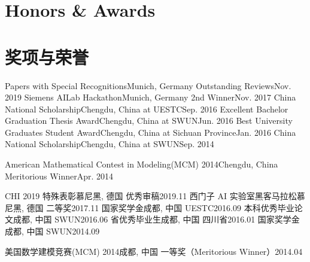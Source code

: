
 {
\section{\textbf{Honors \& Awards}}
}{
\section{\textbf{奖项与荣誉}}
}

 {
  \resumeSubHeadingListStart
    \resumeSubheading
        {Papers with Special Recognitions}{Munich, Germany}
        {Outstanding Reviews}{Nov. 2019}
    \resumeSubheading
        {Siemens AILab Hackathon}{Munich, Germany}
        {2nd Winner}{Nov. 2017}
    \resumeSubheading
        {China National Scholarship}{Chengdu, China}
        {at UESTC}{Sep. 2016}
    \resumeSubheading
        {Excellent Bachelor Graduation Thesis Award}{Chengdu, China}
        {at SWUN}{Jun. 2016}
    \resumeSubheading
        {Best University Graduates Student Award}{Chengdu, China}
        {at Sichuan Province}{Jan. 2016}
    \resumeSubheading
        {China National Scholarship}{Chengdu, China}
        {at SWUN}{Sep. 2014}

    \resumeSubheading
        {American Mathematical Contest in Modeling(MCM) 2014}{Chengdu, China}
        {Meritorious Winner}{Apr. 2014}
  \resumeSubHeadingListEnd
}{

    \resumeSubHeadingListStart
    \resumeSubheading
        {CHI 2019 特殊表彰}{慕尼黑, 德国}
        {优秀审稿}{2019.11}
    \resumeSubheading
        {西门子 AI 实验室黑客马拉松}{慕尼黑, 德国}
        {二等奖}{2017.11}
    \resumeSubheading
        {国家奖学金}{成都, 中国}
        {UESTC}{2016.09}
    \resumeSubheading
        {本科优秀毕业论文}{成都, 中国}
        {SWUN}{2016.06}
    \resumeSubheading
        {省优秀毕业生}{成都, 中国}
        {四川省}{2016.01}
    \resumeSubheading
        {国家奖学金}{成都, 中国}
        {SWUN}{2014.09}

    \resumeSubheading
        {美国数学建模竞赛(MCM) 2014}{成都, 中国}
        {一等奖（Meritorious Winner）}{2014.04}
  \resumeSubHeadingListEnd

}